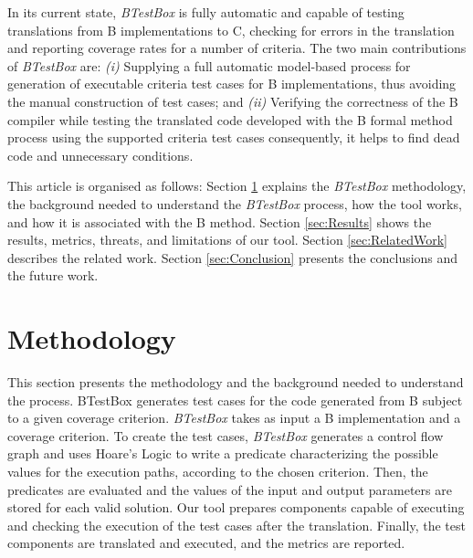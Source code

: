 \documentclass[runningheads]{llncs}
\begin{document}
In its current state,  \textit{BTestBox} is fully automatic and capable of testing translations from B implementations to C, checking for errors in the translation and reporting coverage rates for a number of criteria. 
The two main contributions of  \textit{BTestBox} are: 
\textit{(i)} Supplying a full automatic model-based process for generation of executable criteria test cases for B implementations, thus avoiding the manual  construction of test cases; and
\textit{(ii)} Verifying the correctness of the B compiler while testing the translated code developed with the B formal method process using the supported criteria test cases consequently, it helps to find dead code and unnecessary conditions.

This article is organised as follows: 
Section \ref{sec:BTestBox} explains the  \textit{BTestBox} methodology, the background needed to understand the  \textit{BTestBox} process, how the tool works, and how it is associated with the B method. 
Section \ref{sec:Results} shows the results, metrics, threats, and limitations of our tool. 
Section \ref{sec:RelatedWork} describes the related work. 
Section \ref{sec:Conclusion} presents the conclusions and the future work.

\section{Methodology} \label{sec:BTestBox}

This section presents the methodology and the background needed to understand the process. 
BTestBox generates test cases for the code generated from B subject to a given coverage criterion.
\textit{BTestBox} takes as input a B implementation and a coverage criterion. 
To create the test cases, \textit{BTestBox} generates a control flow graph and uses Hoare's Logic to write a predicate characterizing the possible values for the execution paths, according to the chosen criterion. 
Then, the predicates are evaluated and the values of the input and output parameters are stored for each valid solution. 
Our tool prepares components capable of executing and checking the execution of the test cases after the translation. Finally, the test components are translated and executed, and the metrics are reported.
\end{document}
